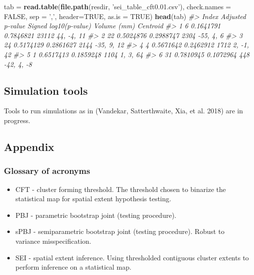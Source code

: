 \documentclass[]{article}
\newenvironment{Shaded}{\begin{snugshade}}{\end{snugshade}}
\newcommand{\KeywordTok}[1]{\textcolor[rgb]{0.13,0.29,0.53}{\textbf{#1}}}
\newcommand{\DataTypeTok}[1]{\textcolor[rgb]{0.13,0.29,0.53}{#1}}
\newcommand{\StringTok}[1]{\textcolor[rgb]{0.31,0.60,0.02}{#1}}
\newcommand{\CommentTok}[1]{\textcolor[rgb]{0.56,0.35,0.01}{\textit{#1}}}
\newcommand{\OtherTok}[1]{\textcolor[rgb]{0.56,0.35,0.01}{#1}}
\newcommand{\NormalTok}[1]{#1}
\providecommand{\tightlist}{%
  \setlength{\itemsep}{0pt}\setlength{\parskip}{0pt}}
\begin{document}
\begin{Shaded}
\begin{Highlighting}[]
\NormalTok{tab =}\StringTok{ }\KeywordTok{read.table}\NormalTok{(}\KeywordTok{file.path}\NormalTok{(resdir, }\StringTok{'sei_table_cft0.01.csv'}\NormalTok{), }\DataTypeTok{check.names =} \OtherTok{FALSE}\NormalTok{, }\DataTypeTok{sep =} \StringTok{','}\NormalTok{, }\DataTypeTok{header=}\OtherTok{TRUE}\NormalTok{, }\DataTypeTok{as.is =} \OtherTok{TRUE}\NormalTok{)}
\KeywordTok{head}\NormalTok{(tab)}
\CommentTok{#>   Index Adjusted p-value Signed log10(p-value) Volume (mm)   Centroid}
\CommentTok{#> 1     6        0.1641791             0.7846821       23112 44, -4, 11}
\CommentTok{#> 2    22        0.5024876             0.2988747        2304  -55, 4, 6}
\CommentTok{#> 3    24        0.5174129             0.2861627        2144 -35, 9, 12}
\CommentTok{#> 4     4        0.5671642             0.2462912        1712  2, -1, 42}
\CommentTok{#> 5     1        0.6517413             0.1859248        1104   1, 3, 64}
\CommentTok{#> 6    31        0.7810945             0.1072964         448 -42, 4, -8}
\end{Highlighting}
\end{Shaded}

\subsection{Simulation tools}\label{simulation-tools}

Tools to run simulations as in (Vandekar, Satterthwaite, Xia, et al.
2018) are in progress.

\subsection{Appendix}\label{appendix}

\subsubsection{Glossary of acronyms}\label{glossary-of-acronyms}

\begin{itemize}
\tightlist
\item
  CFT - cluster forming threshold. The threshold chosen to binarize the
  statistical map for spatial extent hypothesis testing.
\item
  PBJ - parametric bootstrap joint (testing procedure).
\item
  sPBJ - semiparametric bootstrap joint (testing procedure). Robust to
  variance misspecification.
\item
  SEI - spatial extent inference. Using thresholded contiguous cluster
  extents to perform inference on a statistical map.
\end{itemize}
\end{document}
